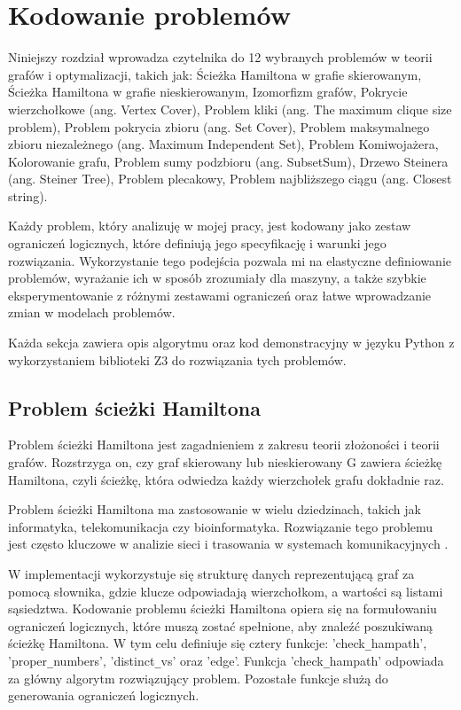 \chapter{Kodowanie problemów}

Niniejszy rozdział wprowadza czytelnika do 12 wybranych problemów w teorii grafów i optymalizacji, takich jak:
Ścieżka Hamiltona w grafie skierowanym,
Ścieżka Hamiltona w grafie nieskierowanym, 
Izomorfizm grafów, 
Pokrycie wierzchołkowe (ang. Vertex Cover), 
Problem kliki (ang. The maximum clique size problem), 
Problem pokrycia zbioru (ang. Set Cover), 
Problem maksymalnego zbioru niezależnego (ang. Maximum Independent Set), 
Problem Komiwojażera, 
Kolorowanie grafu, 
Problem sumy podzbioru (ang. SubsetSum), 
Drzewo Steinera (ang. Steiner Tree), 
Problem plecakowy, 
Problem najbliższego ciągu (ang. Closest string).

Każdy problem, który analizuję w mojej pracy, jest kodowany jako zestaw ograniczeń logicznych, które definiują jego specyfikację i warunki jego rozwiązania. Wykorzystanie tego podejścia pozwala mi na elastyczne definiowanie problemów, wyrażanie ich w sposób zrozumiały dla maszyny, a także szybkie eksperymentowanie z różnymi zestawami ograniczeń oraz łatwe wprowadzanie zmian w modelach problemów.

Każda sekcja zawiera opis algorytmu oraz kod demonstracyjny w języku Python z wykorzystaniem biblioteki Z3 do rozwiązania tych problemów.

\section{Problem ścieżki Hamiltona}

Problem ścieżki Hamiltona jest zagadnieniem z zakresu teorii złożoności i teorii grafów. Rozstrzyga on, czy graf skierowany lub nieskierowany G zawiera ścieżkę Hamiltona, czyli ścieżkę, która odwiedza każdy wierzchołek grafu dokładnie raz.

Problem ścieżki Hamiltona ma zastosowanie w wielu dziedzinach, takich jak informatyka, telekomunikacja czy bioinformatyka. Rozwiązanie tego problemu jest często kluczowe w analizie sieci i trasowania w systemach komunikacyjnych \cite{enwiki:1190136070}.

W implementacji wykorzystuje się strukturę danych reprezentującą graf za pomocą słownika, gdzie klucze odpowiadają wierzchołkom, a wartości są listami sąsiedztwa. Kodowanie problemu ścieżki Hamiltona opiera się na formułowaniu ograniczeń logicznych, które muszą zostać spełnione, aby znaleźć poszukiwaną ścieżkę Hamiltona. W tym celu definiuje się cztery funkcje: 'check\verb|_|hampath', 'proper\verb|_|numbers', 'distinct\verb|_|vs' oraz 'edge'. Funkcja 'check\verb|_|hampath' odpowiada za główny algorytm rozwiązujący problem. Pozostałe funkcje służą do generowania ograniczeń logicznych.

